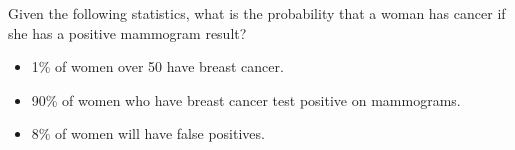 \begin{Exercise} %
 \label{ex1.4.2}					
 Given the following statistics, what is the probability that a woman has cancer if she has a positive mammogram result? \cite{BDA_N6}
\begin{itemize}[noitemsep]
	\item 1\% of women over 50 have breast cancer.
	\item 90\% of women who have breast cancer test positive on mammograms.
	\item 8\% of women will have false positives.
\end{itemize}	
\end{Exercise} 

